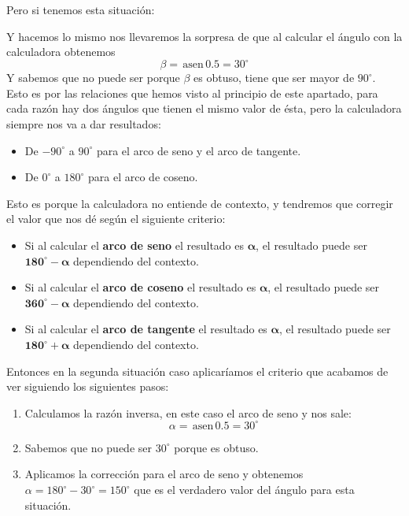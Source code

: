 \documentclass[a4paper,11pt,answers]{exam}
\newcommand{\degree}{^\circ}
\newcommand{\asen}{\,\mathrm{asen}\,}
\begin{document}
Pero si tenemos esta situación:
\begin{center}
\end{center}
Y hacemos lo mismo nos llevaremos la sorpresa de que al calcular el ángulo con la calculadora
obtenemos
\[\beta = \asen 0.5 = 30\degree\]
Y sabemos que no puede ser porque $\beta$ es obtuso, tiene que ser mayor de $90\degree$.\\

Esto es por las relaciones que hemos visto al principio de este apartado, para cada razón hay dos
ángulos que tienen el mismo valor de ésta, pero la calculadora siempre nos va a dar resultados:
\begin{itemize}
\item De $-90\degree$ a $90\degree$ para el arco de seno y el arco de tangente.
\item De $0\degree$ a $180\degree$ para el arco de coseno.
\end{itemize}
Esto es porque la calculadora no entiende de contexto, y tendremos que corregir el valor que nos
dé según el siguiente criterio:
\begin{itemize}
\item Si al calcular el \textbf{arco de seno} el resultado es $\boldsymbol{\alpha}$,
  el resultado puede ser $\boldsymbol{180\degree - \alpha}$ dependiendo del contexto.
\item  Si al calcular el \textbf{arco de coseno} el resultado es $\boldsymbol{\alpha}$,
  el resultado puede ser $\boldsymbol{360\degree - \alpha}$ dependiendo del contexto.
\item Si al calcular el \textbf{arco de tangente} el resultado es $\boldsymbol{\alpha}$,
  el resultado puede ser $\boldsymbol{180\degree + \alpha}$ dependiendo del contexto.
\end{itemize}

Entonces en la segunda situación caso aplicaríamos el criterio que acabamos de ver siguiendo los siguientes
pasos:
\begin{enumerate}
\item Calculamos la razón inversa, en este caso el arco de seno y nos sale:
  \[\alpha = \asen 0.5 = 30\degree\]
\item Sabemos que no puede ser $30\degree$ porque es obtuso.
\item Aplicamos la corrección para el arco de seno y obtenemos $\alpha = 180\degree - 30\degree =
  150\degree$ que es el verdadero valor del ángulo para esta situación.
\end{enumerate}
\end{document}
